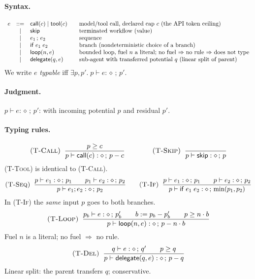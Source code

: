 \documentclass[11pt]{article}
\theoremstyle{plain}
\newcommand{\kw}[1]{\mathsf{#1}}                      %
\newcommand{\J}[3]{#1 \vdash #2 : \diamond\,;\,#3}    %
\newcommand{\rul}[1]{\textsc{(#1)}}
\begin{document}
\paragraph{Syntax.}
\[
\begin{array}{rcl@{\qquad}l}
e & ::= & \kw{call}(c) \mid \kw{tool}(c) & \text{model/tool call, declared cap $c$ (the API token ceiling)} \\
  & \mid & \kw{skip}                      & \text{terminated workflow (value)} \\
  & \mid & e_1 \,;\, e_2                  & \text{sequence} \\
  & \mid & \kw{if}\; e_1\; e_2            & \text{branch (nondeterministic choice of a branch)} \\
  & \mid & \kw{loop}(n, e)                & \text{bounded loop, fuel $n$ a literal; no fuel $\Rightarrow$ no rule $\Rightarrow$ does not type} \\
  & \mid & \kw{delegate}(q, e)            & \text{sub-agent with transferred potential $q$ (linear split of parent)}
\end{array}
\]
We write $e$ \emph{typable} iff $\exists p, p'.\;\J{p}{e}{p'}$.

\paragraph{Judgment.}
$\J{p}{e}{p'}$: with incoming potential $p$ and residual $p'$.

\paragraph{Typing rules.}
\[
\rul{T-Call}\;\; \frac{p \ge c}{\J{p}{\kw{call}(c)}{p - c}}
\qquad\qquad
\rul{T-Skip}\;\; \frac{}{\J{p}{\kw{skip}}{p}}
\]
\noindent\rul{T-Tool} is identical to \rul{T-Call}.
\[
\rul{T-Seq}\;\; \frac{\J{p}{e_1}{p_1} \qquad \J{p_1}{e_2}{p_2}}{\J{p}{e_1 ; e_2}{p_2}}
\qquad
\rul{T-If}\;\; \frac{\J{p}{e_1}{p_1} \qquad \J{p}{e_2}{p_2}}{\J{p}{\kw{if}\; e_1\; e_2}{\min(p_1, p_2)}}
\]
\noindent In \rul{T-If} the \emph{same} input $p$ goes to both branches.
\[
\rul{T-Loop}\;\; \frac{\J{p_b}{e}{p_b'} \qquad b := p_b - p_b' \qquad p \ge n \cdot b}{\J{p}{\kw{loop}(n, e)}{p - n \cdot b}}
\]
\noindent Fuel $n$ is a literal; no fuel $\Rightarrow$ no rule.
\[
\rul{T-Del}\;\; \frac{\J{q}{e}{q'} \qquad p \ge q}{\J{p}{\kw{delegate}(q, e)}{p - q}}
\]
\noindent Linear split: the parent transfers $q$; conservative.
\end{document}
